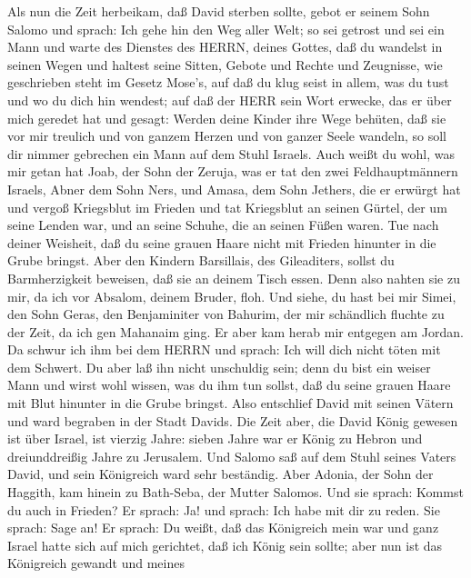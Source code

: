  Als nun die Zeit herbeikam, daß David sterben sollte, gebot
er seinem Sohn Salomo und sprach:  Ich gehe hin den Weg
aller Welt; so sei getrost und sei ein Mann  und warte des
Dienstes des HERRN, deines Gottes, daß du wandelst in seinen Wegen und
haltest seine Sitten, Gebote und Rechte und Zeugnisse, wie geschrieben
steht im Gesetz Mose's, auf daß du klug seist in allem, was du tust und
wo du dich hin wendest;  auf daß der HERR sein Wort erwecke,
das er über mich geredet hat und gesagt: Werden deine Kinder ihre Wege
behüten, daß sie vor mir treulich und von ganzem Herzen und von ganzer
Seele wandeln, so soll dir nimmer gebrechen ein Mann auf dem Stuhl
Israels.  Auch weißt du wohl, was mir getan hat Joab, der
Sohn der Zeruja, was er tat den zwei Feldhauptmännern Israels, Abner dem
Sohn Ners, und Amasa, dem Sohn Jethers, die er erwürgt hat und vergoß
Kriegsblut im Frieden und tat Kriegsblut an seinen Gürtel, der um seine
Lenden war, und an seine Schuhe, die an seinen Füßen waren. 
Tue nach deiner Weisheit, daß du seine grauen Haare nicht mit Frieden
hinunter in die Grube bringst.  Aber den Kindern Barsillais,
des Gileaditers, sollst du Barmherzigkeit beweisen, daß sie an deinem
Tisch essen. Denn also nahten sie zu mir, da ich vor Absalom, deinem
Bruder, floh.  Und siehe, du hast bei mir Simei, den Sohn
Geras, den Benjaminiter von Bahurim, der mir schändlich fluchte zu der
Zeit, da ich gen Mahanaim ging. Er aber kam herab mir entgegen am
Jordan. Da schwur ich ihm bei dem HERRN und sprach: Ich will dich nicht
töten mit dem Schwert.  Du aber laß ihn nicht unschuldig
sein; denn du bist ein weiser Mann und wirst wohl wissen, was du ihm tun
sollst, daß du seine grauen Haare mit Blut hinunter in die Grube
bringst.  Also entschlief David mit seinen Vätern und ward
begraben in der Stadt Davids.  Die Zeit aber, die David
König gewesen ist über Israel, ist vierzig Jahre: sieben Jahre war er
König zu Hebron und dreiunddreißig Jahre zu Jerusalem.  Und
Salomo saß auf dem Stuhl seines Vaters David, und sein Königreich ward
sehr beständig.  Aber Adonia, der Sohn der Haggith, kam
hinein zu Bath-Seba, der Mutter Salomos. Und sie sprach: Kommst du auch
in Frieden? Er sprach: Ja!  und sprach: Ich habe mit dir zu
reden. Sie sprach: Sage an!  Er sprach: Du weißt, daß das
Königreich mein war und ganz Israel hatte sich auf mich gerichtet, daß
ich König sein sollte; aber nun ist das Königreich gewandt und meines
